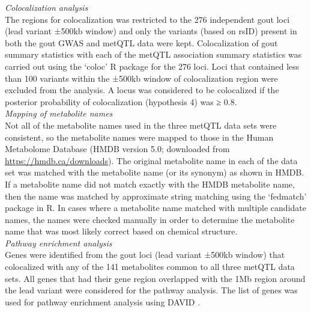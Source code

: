 \documentclass[gucdd,article,submit,pdftex,moreauthors]{Definitions/mdpi}
\begin{document}
\noindent
\textit{Colocalization analysis}\\
The regions for colocalization was restricted to the 276 independent gout loci (lead variant ±500kb window) and only the variants (based on rsID) present in both the gout GWAS and metQTL data were kept.
Colocalization of gout summary statistics with each of the metQTL association summary statistics was carried out using the `coloc' \citep{giambartolomei_bayesian_2014} R \citep{r_core_team_r_2023} package for the 276 loci.
Loci that contained less than 100 variants within the ±500kb window of colocalization region were excluded from the analysis.
A locus was considered to be colocalized if the posterior probability of colocalization (hypothesis 4) was ≥ 0.8.
\\

\noindent
\textit{Mapping of metabolite names}\\
Not all of the metabolite names used in the three metQTL data sets were consistent, so the metabolite names were mapped to those in the Human Metabolome Database \citep{wishart_hmdb_2022} (HMDB version 5.0; downloaded from \url{https://hmdb.ca/downloads}).
The original metabolite name in each of the data set was matched with the metabolite name (or its synonym) as shown in HMDB.
If a metabolite name did not match exactly with the HMDB metabolite name, then the name was matched by approximate string matching using the `fedmatch' \citep{cohen_us_2021} package in R.
In cases where a metabolite name matched with multiple candidate names, the names were checked manually in order to determine the metabolite name that was most likely correct based on chemical structure.
\\

\noindent
\textit{Pathway enrichment analysis}\\
Genes were identified from the gout loci (lead variant ±500kb window) that colocalized with any of the 141 metabolites common to all three metQTL data sets.
All genes that had their gene region overlapped with the 1Mb region around the lead variant were considered for the pathway analysis.
The list of genes was used for pathway enrichment analysis using DAVID \citep{huang_systematic_2009,huang_bioinformatics_2009}.
\\
\end{document}
